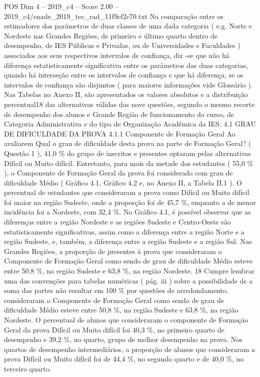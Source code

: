 \begin{textsample}{POS Dim 4 – 2019\_c4 – Score 2.00 – 2019\_c4/enade\_2019\_tec\_rad\_11f9cf2c70.txt}
Na comparação entre os estimadores dos parâmetros de duas classes de uma dada categoria ( e.g.
Norte e Nordeste nas Grandes Regiões, de primeiro e último quarto dentro de desempenho, de IES Públicas e Privadas, ou de Universidades e Faculdades ) associados aos seus respectivos intervalos de confiança, diz -se que não há diferença estatisticamente significativa entre os parâmetros das duas categorias, quando há interseção entre os intervalos de confiança e que há diferença, se os intervalos de confiança são disjuntos ( para maiores informações vide Glossário ).
Nas Tabelas no Anexo II, são apresentados os valores absolutos e a distribuição percentual18 das alternativas válidas das nove questões, segundo o mesmo recorte de desempenho dos alunos e Grande Região de funcionamento do curso, de Categoria Administrativa e do tipo de Organização Acadêmica da IES. 4.1 GRAU DE DIFICULDADE DA PROVA 4.1.1 Componente de Formação Geral Ao avaliarem Qual o grau de dificuldade desta prova na parte de Formação Geral? ( Questão 1 ), 41,0 \% do grupo de inscritos e presentes optaram pelas alternativas Difícil ou Muito difícil.
Entretanto, para mais da metade dos estudantes ( 55,0 \% ), o Componente de Formação Geral da prova foi considerado com grau de dificuldade Médio ( Gráfico 4.1, Gráfico 4.2 e, no Anexo II, a Tabela II.1 ).
O percentual de estudantes que consideraram a prova como Difícil ou Muito difícil foi maior na região Sudeste, onde a proporção foi de 45,7 \%, enquanto a de menor incidência foi a Nordeste, com 32,4 \%.
No Gráfico 4.1, é possível observar que as diferenças entre a região Nordeste e as regiões Sudeste e Centro-Oeste são estatisticamente significativas, assim como a diferença entre a região Norte e a região Sudeste, e, também, a diferença entre a região Sudeste e a região Sul.
Nas Grandes Regiões, a proporção de presentes à prova que consideraram o Componente de Formação Geral como sendo de grau de dificuldade Médio esteve entre 50,8 \%, na região Sudeste e 63,8 \%, na região Nordeste. 18 Cumpre lembrar uma das convenções para tabelas numéricas ( pág. iii ) sobre a possibilidade de a soma das partes não resultar em 100 \% por questões de arredondamento. consideraram o Componente de Formação Geral como sendo de grau de dificuldade Médio esteve entre 50,8 \%, na região Sudeste e 63,8 \%, na região Nordeste.
O percentual de alunos que consideraram o componente de Formação Geral da prova Difícil ou Muito difícil foi 40,3 \%, no primeiro quarto de desempenho e 39,2 \%, no quarto, grupo de melhor desempenho na prova.
Nos quartos de desempenho intermediários, a proporção de alunos que consideraram a prova Difícil ou Muito difícil foi de 44,4 \%, no segundo quarto e de 40,0 \%, no terceiro quarto.

\end{textsample}
